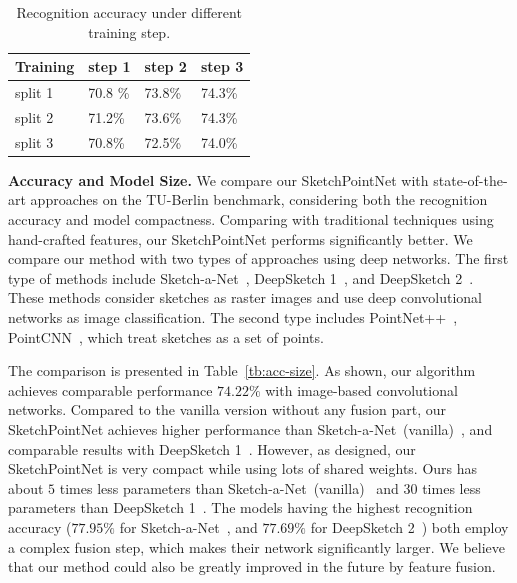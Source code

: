 \begin{table}[htbp]
\centering
\caption{Recognition accuracy under different training step.}
\label{tbl:iteration}
\begin{tabular}{l|lll}
    \hline
     Training& step 1&  step 2& step 3\\
    \hline
     split 1& 70.8 \% & 73.8\% & 74.3\% \\
     split 2& 71.2\% & 73.6\% & 74.3\% \\
     split 3& 70.8\% & 72.5\% & 74.0\% \\
    \hline
\end{tabular}
\end{table}



\noindent\textbf{Accuracy and Model Size.}
%
We compare our SketchPointNet with state-of-the-art approaches on the TU-Berlin benchmark, considering both the recognition accuracy and model compactness.
%
Comparing with traditional techniques using hand-crafted features, our SketchPointNet performs significantly better.
%
We compare our method with two types of approaches using deep networks.
The first type of methods include Sketch-a-Net~\cite{Yu2015SketchaNetTB}, DeepSketch 1~\cite{Seddati2015DeepSketchDC}, and DeepSketch 2~\cite{Dupont2016DeepSketch2D}.
These methods consider sketches as raster images and use deep convolutional networks as image classification.
The second type includes PointNet++~\cite{qi2017pointnetplusplus}, PointCNN~\cite{1801.07791}, which treat sketches as a set of points.


The comparison is presented in Table~\ref{tb:acc-size}.
As shown, our algorithm achieves comparable performance $74.22\%$ with image-based convolutional networks.
%
Compared to the vanilla version without any fusion part, our SketchPointNet achieves higher performance than Sketch-a-Net~(vanilla)~\cite{Yu2015SketchaNetTB}, and comparable results with DeepSketch 1~\cite{Seddati2015DeepSketchDC}.
However, as designed, our SketchPointNet is very compact while using lots of shared weights.
Ours has about $5$ times less parameters than Sketch-a-Net~(vanilla)~\cite{Yu2015SketchaNetTB} and $30$ times less parameters than DeepSketch 1~\cite{Seddati2015DeepSketchDC}.
%
The models having the highest recognition accuracy ($77.95\%$ for Sketch-a-Net~\cite{Yu2015SketchaNetTB}, and $77.69\%$ for DeepSketch 2~\cite{Dupont2016DeepSketch2D}) both employ a complex fusion step, which makes their network significantly larger.
%
We believe that our method could also be greatly improved in the future by feature fusion.


